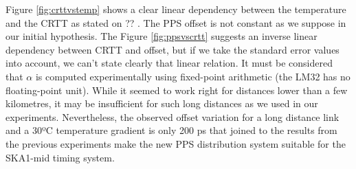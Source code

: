 Figure \ref{fig:crttvstemp} shows a clear linear dependency between the 
temperature and the CRTT as stated on ?? . The PPS offset is not constant as 
we suppose in our initial hypothesis. The Figure \ref{fig:ppsvscrtt} suggests 
an inverse linear dependency between CRTT and offset, but if we take the 
standard error values into account, we can't state clearly that linear 
relation. It must be considered that $\alpha$ is computed experimentally using 
fixed-point arithmetic (the LM32 has no floating-point unit). While it seemed 
to work right for distances lower than a few kilometres, it may be insufficient 
for such long distances as we used in our experiments. Nevertheless, the 
observed offset variation for a long distance link and a 30ºC temperature 
gradient is only 200 ps that joined to the results from the previous 
experiments make the new PPS distribution system suitable for the SKA1-mid 
timing system.



